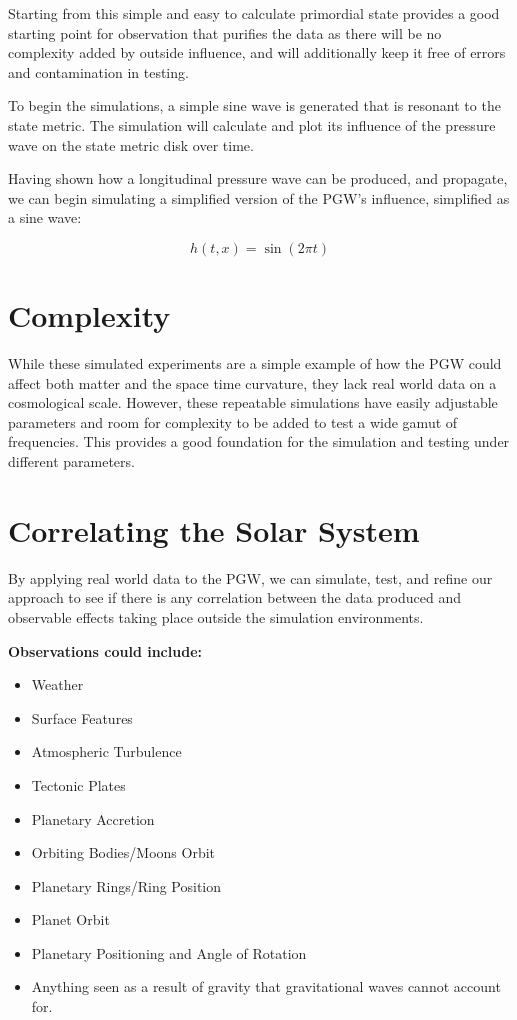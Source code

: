 \documentclass[12pt]{article}
\begin{document}
Starting from this simple and easy to calculate primordial state provides a good starting point for observation that purifies the data as there will be no complexity added by outside influence, and will additionally keep it free of errors and contamination in testing.

To begin the simulations, a simple sine wave is generated that is resonant to the state metric. The simulation will calculate and plot its influence of the pressure wave on the state metric disk over time.

Having shown how a longitudinal pressure wave can be produced, and propagate, we can begin simulating a simplified version of the PGW’s influence, simplified as a sine wave:

\[
h(t,x) = \sin(2\pi t)
\]

\section*{Complexity}

While these simulated experiments are a simple example of how the PGW could affect both matter and the space time curvature, they lack real world data on a cosmological scale. However, these repeatable simulations have easily adjustable parameters and room for complexity to be added to test a wide gamut of frequencies. This provides a good foundation for the simulation and testing under different parameters.

\section*{Correlating the Solar System}

By applying real world data to the PGW, we can simulate, test, and refine our approach to see if there is any correlation between the data produced and observable effects taking place outside the simulation environments.

\textbf{Observations could include:}
\begin{itemize}
    \item Weather
    \item Surface Features
    \item Atmospheric Turbulence
    \item Tectonic Plates
    \item Planetary Accretion
    \item Orbiting Bodies/Moons Orbit
    \item Planetary Rings/Ring Position
    \item Planet Orbit
    \item Planetary Positioning and Angle of Rotation
    \item Anything seen as a result of gravity that gravitational waves cannot account for.
\end{itemize}
\end{document}
